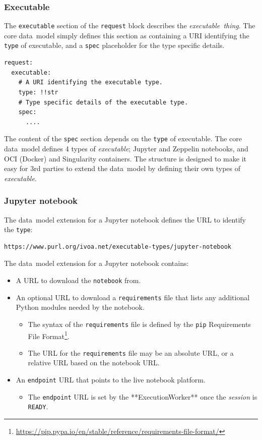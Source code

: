 \documentclass[11pt,a4paper]{ivoa}
\newcommand{\datamodel} {data~model}
\newcommand{\execworkerclass} {**ExecutionWorker**}
\newcommand{\executable} {\textit{executable}}
\newcommand{\executablething}[1] {\textit{executable~thing#1}}
\newcommand{\workerjob}[1] {\textit{session#1}}
\newcommand{\jupyter} {Jupyter}
\newcommand{\jupyternotebook} {Jupyter notebook}
\newcommand{\python} {Python}
\newcommand{\zeppelin} {Zeppelin}
\newcommand{\singularity} {Singularity}
\newcommand{\codeword}[1] {\texttt{#1}}
\newcommand{\footurl}[1] {\footnote{\url{#1}}}
\begin{document}
\subsubsection{Executable}
\label{datamodel-executable}

The \codeword{executable} section of the \codeword{request} block describes the \executablething{}.
The core \datamodel{} simply defines this section as containing a URI identifying the \codeword{type} of executable,
and a \codeword{spec} placeholder for the type specific details.

\begin{lstlisting}[]
request:
  executable:
    # A URI identifying the executable type.
    type: !!str
    # Type specific details of the executable type.
    spec:
      ....
\end{lstlisting}

The content of the \codeword{spec} section depends on the \codeword{type} of executable.
The core \datamodel{} defines 4 types of \executable{};
\jupyter{} and \zeppelin{} notebooks, and OCI (Docker) and \singularity{} containers.
The structure is designed to make it easy for 3rd parties to extend the \datamodel{}
by defining their own types of \executable{}.

\subsubsection{Jupyter notebook}
\label{datamodel-jupyter-notebook}

The \datamodel{} extension for a \jupyternotebook{} defines the URL
to identify the \codeword{type}:
\begin{lstlisting}[]
https://www.purl.org/ivoa.net/executable-types/jupyter-notebook
\end{lstlisting}
\hfill \break
The \datamodel{} extension for a \jupyternotebook{} contains:
\begin{itemize}
    \item A URL to download the \codeword{notebook} from.
    \item An optional URL to download a \codeword{requirements} file that lists any additional
    \python{} modules needed by the notebook.
    \begin{itemize}
        \item The syntax of the \codeword{requirements} file is defined by the \codeword{pip}
        Requirements File Format\footurl{https://pip.pypa.io/en/stable/reference/requirements-file-format/}.
        \item The URL for the \codeword{requirements} file may be an absolute URL, or a relative URL based on the notebook URL.
    \end{itemize}
    \item An \codeword{endpoint} URL that points to the live notebook platform.
    \begin{itemize}
        \item The \codeword{endpoint} URL is set by the \execworkerclass{} once the \workerjob{} is \codeword{READY}.
    \end{itemize}
\end{itemize}
\end{document}
